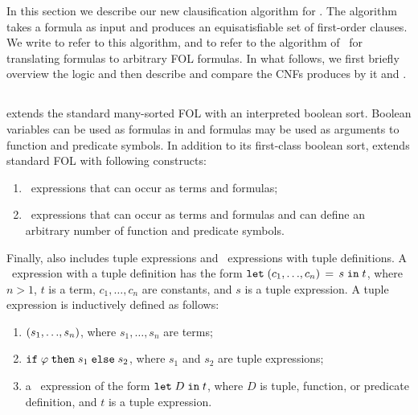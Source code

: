 
In this section we describe our new clausification algorithm for \folb{}. 
The algorithm takes a \folb{} formula as input and produces an equisatisfiable set of first-order clauses. 
We write \nfcnf{} to refer to this algorithm, and \oldcnf{} to refer to the algorithm of~\cite{FOOL} for translating \folb{} formulas to arbitrary FOL formulas. In what follows, we first briefly overview the \folb{} logic and then describe \nfcnf{} and compare the CNFs produces by it and \oldcnf{}.

\subsection{\folb{}}

\folb{} \cite{FOOL} extends the standard many-sorted FOL with an interpreted boolean sort. 
Boolean variables can be used as formulas in \folb{} and formulas may be used as
arguments to function and predicate symbols. In addition to its first-class boolean sort,
\folb{} extends standard FOL with following constructs:
\begin{enumerate}
  \item \ITE\ expressions that can occur as terms and formulas;
  \item \LETIN\ expressions that can occur as terms and formulas and can define an arbitrary number of function and predicate symbols.
\end{enumerate}
Finally, \folb{} also includes tuple expressions and \LETIN\ expressions with tuple definitions. 
A \LETIN\ expression with a tuple definition has the form $\mathtt{let}\;{({c_1},{\ldots},{c_n})}\,=\,{s}\;\allowbreak\mathtt{in}\;{t}$, where $n > 1$, $t$ is a term, $c_1,\ldots,c_n$ are constants, and $s$ is a tuple expression. A tuple expression is inductively defined as follows:
\begin{enumerate}
  \item $({s_1},{\ldots},{s_n})$, where $s_1,\ldots,s_n$ are terms;
  \item $\mathtt{if}\;{\varphi}\;\allowbreak\mathtt{then}\;{s_1}\;\allowbreak\mathtt{else}\;{s_2}$, where $s_1$ and $s_2$ are tuple expressions;
  \item a \LETIN\ expression of the form $\mathtt{let}\;{D}\;\allowbreak\mathtt{in}\;{t}$, where $D$ is tuple, function, or predicate definition, and $t$ is a tuple expression.
\end{enumerate}

